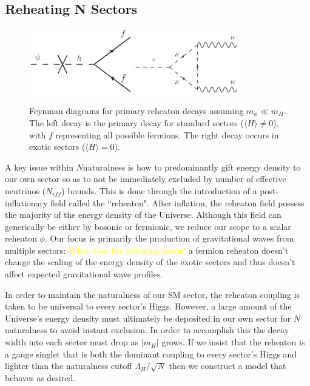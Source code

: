 \documentclass[nofootinbib,twocolumn,preprintnumbers]{revtex4-1}
\begin{document}
\subsection{Reheating N Sectors}

\begin{figure}[tb]
\centering
\begin{minipage}[c]{\textwidth}
\includegraphics[width=0.4\textwidth]{standardDecay.eps}
\includegraphics[width=0.4\textwidth]{exoticDecay.eps}
\end{minipage}
\hfill
\caption{Feynman diagrams for primary reheaton decays assuming $m_{\phi} \ll m_H$. The left decay is the primary decay for standard sectors ($\langle H\rangle\neq 0$), with $f$ representing all possible fermions. The right decay occurs in exotic sectors ($\langle H\rangle = 0$).
}
\label{fig:reheatonDecays}
\end{figure}

A key issue within $N$naturalness is how to predominantly gift energy density to our own sector so as to not be immediately excluded by number of effective neutrinos ($N_{eff}$) bounds. This is done through the introduction of a post-inflationary field called the ``reheaton". After inflation, the reheaton field possess the majority of the energy density of the Universe. Although this field can generically be either by bosonic or fermionic, we reduce our scope to a scalar reheaton $\phi$. Our focus is primarily the production of gravitational waves from multiple sectors: \textcolor{yellow}{What does the following mean?} a fermion reheaton doesn't change the scaling of the energy density of the exotic sectors and thus doesn't affect expected gravitational wave profiles.

In order to maintain the naturalness of our SM sector, the reheaton coupling is taken to be universal to every sector's Higgs. However, a large amount of the Universe's energy density must ultimately be deposited in our own sector for $N$naturalness to avoid instant exclusion. In order to accomplish this the decay width into each sector must drop as $\vert m_H\vert$ grows. If we insist that the reheaton is a gauge singlet that is both the dominant coupling to every sector's Higgs and lighter than the naturalness cutoff $\Lambda_H/\sqrt{N}$ then we construct a model that behaves as desired. 
\end{document}

